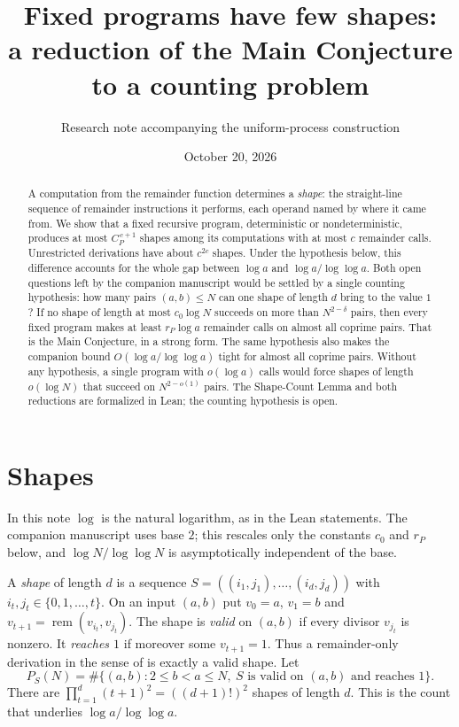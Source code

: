 \documentclass[11pt]{article}
\title{Fixed programs have few shapes:\\a reduction of the Main Conjecture to a counting problem}
\author{Research note accompanying the uniform-process construction}
\date{October 20, 2026}
\theoremstyle{remark}
\newcommand{\rem}{\operatorname{rem}}
\begin{document}
\maketitle

\begin{abstract}
A computation from the remainder function determines a \emph{shape}: the
straight-line sequence of remainder instructions it performs, each operand
named by where it came from. We show that a fixed recursive program,
deterministic or nondeterministic, produces at most $C_P^{\,c+1}$ shapes
among its computations with at most $c$ remainder calls. Unrestricted derivations have about
$c^{2c}$ shapes. Under the hypothesis below, this difference accounts for the
whole gap between $\log a$ and $\log a/\log\log a$. Both open questions left by the companion manuscript
\cite{companion} would be settled by a single counting hypothesis: how many pairs
$(a,b)\leq N$ can one shape of length $d$ bring to the value $1$? If no shape
of length at most $c_0\log N$ succeeds on more than $N^{2-\delta}$ pairs, then
every fixed program makes at least $r_P\log a$ remainder calls on almost all
coprime pairs. That is the Main Conjecture, in a strong form. The same
hypothesis also makes the companion bound $O(\log a/\log\log a)$ tight for
almost all coprime pairs. Without any hypothesis, a single program with $o(\log a)$
calls would force shapes of length $o(\log N)$ that succeed on $N^{2-o(1)}$
pairs. The Shape-Count Lemma and both reductions are formalized in Lean; the
counting hypothesis is open.
\end{abstract}

\section{Shapes}

In this note $\log$ is the natural logarithm, as in the Lean statements. The
companion manuscript uses base $2$; this rescales only the constants $c_0$ and
$r_P$ below, and $\log N/\log\log N$ is asymptotically independent of the base.

A \emph{shape} of length $d$ is a sequence $S=((i_1,j_1),\ldots,(i_d,j_d))$
with $i_t,j_t\in\{0,1,\ldots,t\}$. On an input $(a,b)$ put $v_0=a$, $v_1=b$
and $v_{t+1}=\rem(v_{i_t},v_{j_t})$. The shape is \emph{valid} on $(a,b)$ if
every divisor $v_{j_t}$ is nonzero. It \emph{reaches $1$} if moreover some
$v_{t+1}=1$. Thus a remainder-only derivation in the sense of
\cite{companion} is exactly a valid shape. Let
\[
P_S(N)=\#\{(a,b):2\leq b<a\leq N,\ S\text{ is valid on }(a,b)\text{ and reaches }1\}.
\]
There are $\prod_{t=1}^{d}(t+1)^2=((d+1)!)^2$ shapes of length $d$. This is
the count that underlies $\log a/\log\log a$.
\end{document}
